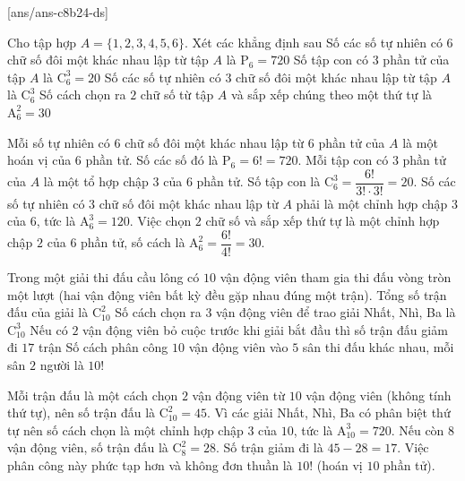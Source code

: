 
\setcounter{ex}{0}
[ans/ans-c8b24-ds]
\begin{ex}%
	Cho tập hợp $A = \{1, 2, 3, 4, 5, 6\}$. Xét các khẳng định sau
	\choiceTF
	{Số các số tự nhiên có $6$ chữ số đôi một khác nhau lập từ tập $A$ là $\mathrm{P}_6 = 720$}
	{\True Số tập con có $3$ phần tử của tập $A$ là $\mathrm{C}_6^3 = 20$}
	{Số các số tự nhiên có $3$ chữ số đôi một khác nhau lập từ tập $A$ là $\mathrm{C}_6^3$}
	{\True Số cách chọn ra $2$ chữ số từ tập $A$ và sắp xếp chúng theo một thứ tự là $\mathrm{A}_6^2 = 30$}
	\loigiai
	{
		\begin{itemchoice}
			\itemch Mỗi số tự nhiên có $6$ chữ số đôi một khác nhau lập từ $6$ phần tử của $A$ là một hoán vị của $6$ phần tử. Số các số đó là $\mathrm{P}_6 = 6! = 720$.
			\itemch Mỗi tập con có $3$ phần tử của $A$ là một tổ hợp chập $3$ của $6$ phần tử. Số tập con là $\mathrm{C}_6^3 = \dfrac{6!}{3! \cdot 3!} = 20$.
			\itemch Số các số tự nhiên có $3$ chữ số đôi một khác nhau lập từ $A$ phải là một chỉnh hợp chập $3$ của $6$, tức là $\mathrm{A}_6^3 = 120$.
			\itemch Việc chọn $2$ chữ số và sắp xếp thứ tự là một chỉnh hợp chập $2$ của $6$ phần tử, số cách là $\mathrm{A}_6^2 = \dfrac{6!}{4!} = 30$.
		\end{itemchoice}
	}
\end{ex}
\begin{ex}%
	Trong một giải thi đấu cầu lông có $10$ vận động viên tham gia thi đấu vòng tròn một lượt (hai vận động viên bất kỳ đều gặp nhau đúng một trận).
	\choiceTF
	{\True Tổng số trận đấu của giải là $\mathrm{C}_{10}^2$}
	{Số cách chọn ra $3$ vận động viên để trao giải Nhất, Nhì, Ba là $\mathrm{C}_{10}^3$}
	{\True Nếu có $2$ vận động viên bỏ cuộc trước khi giải bắt đầu thì số trận đấu giảm đi $17$ trận}
	{Số cách phân công $10$ vận động viên vào $5$ sân thi đấu khác nhau, mỗi sân $2$ người là $10!$}
	\loigiai
	{
		\begin{itemchoice}
			\itemch Mỗi trận đấu là một cách chọn $2$ vận động viên từ $10$ vận động viên (không tính thứ tự), nên số trận đấu là $\mathrm{C}_{10}^2 = 45$.
			\itemch Vì các giải Nhất, Nhì, Ba có phân biệt thứ tự nên số cách chọn là một chỉnh hợp chập $3$ của $10$, tức là $\mathrm{A}_{10}^3 = 720$.
			\itemch Nếu còn $8$ vận động viên, số trận đấu là $\mathrm{C}_8^2 = 28$. Số trận giảm đi là $45 - 28 = 17$.
			\itemch Việc phân công này phức tạp hơn và không đơn thuần là $10!$ (hoán vị $10$ phần tử).
		\end{itemchoice}
	}
\end{ex}
